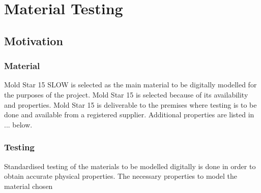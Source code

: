 \chapter{Material Testing}
\label{chp:MT}

\section{Motivation}

\subsection{Material}

Mold Star 15 SLOW is selected as the main material to be digitally modelled for the purposes of the project. Mold Star 15 is selected because of its availability and properties. Mold Star 15 is deliverable to the premises where testing is to be done and available from a registered supplier. Additional properties are listed in ... below.

\begin{table}[]
\centering
\caption{Given Material Properties}
\label{tab:gmp}
\end{table}


\subsection{Testing}

Standardised testing of the materials to be modelled digitally is done in order to obtain accurate physical properties. The necessary properties to model the material chosen 